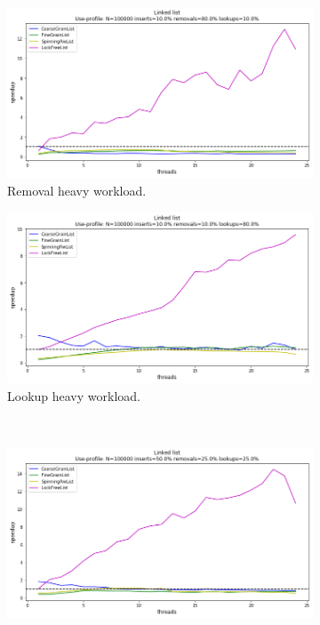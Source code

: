 \documentclass[11pt]{article}
\begin{document}
\begin{figure}[h]
\begin{subfigure}{.6\textwidth}
  \centering
  \includegraphics[width=.8\linewidth]{figs/lateday/combined/lateday_combined_list_insert_10_lookup_10_removal_80}
  \caption{Removal heavy workload.}
  \label{fig:listRemovalHeavy}
\end{subfigure}%
\begin{subfigure}{.6\textwidth}
  \centering
  \includegraphics[width=.8\linewidth]{figs/lateday/combined/lateday_combined_list_insert_10_lookup_80_removal_10}
  \caption{Lookup heavy workload.}
  \label{fig:listLookupHeavy}
\end{subfigure}
\\ %
\begin{subfigure}{.6\textwidth}
  \centering
  \includegraphics[width=.8\linewidth]{figs/lateday/combined/lateday_combined_list_insert_50_lookup_25_removal_25}

\end{subfigure}
\end{figure}
\end{document}
